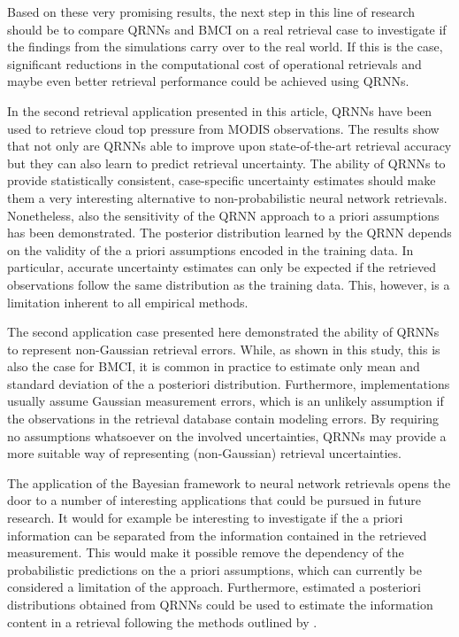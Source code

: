 \documentclass[journal abbreviation, manuscript]{copernicus}
\begin{document}
Based on these very promising results, the next step in this line of research
should be to compare QRNNs and BMCI on a real retrieval case to investigate if
the findings from the simulations carry over to the real world. If this is the
case, significant reductions in the computational cost of operational retrievals
and maybe even better retrieval performance could be achieved using QRNNs.

In the second retrieval application presented in this article, QRNNs have been
used to retrieve cloud top pressure from MODIS observations. The results show
that not only are QRNNs able to improve upon state-of-the-art retrieval accuracy
but they can also learn to predict retrieval uncertainty. The ability of QRNNs
to provide statistically consistent, case-specific uncertainty estimates should
make them a very interesting alternative to non-probabilistic neural network
retrievals. Nonetheless, also the sensitivity of the QRNN approach to a priori
assumptions has been demonstrated. The posterior distribution learned by the
QRNN depends on the validity of the a priori assumptions encoded in the training
data. In particular, accurate uncertainty estimates can only be expected if the
retrieved observations follow the same distribution as the training data. This,
however, is a limitation inherent to all empirical methods.

The second application case presented here demonstrated the ability of QRNNs to represent
non-Gaussian retrieval errors. While, as shown in this study, this is also the case
for BMCI, it is common in practice to estimate only mean and standard
deviation of the a posteriori distribution. Furthermore, implementations usually
assume Gaussian measurement errors, which is an unlikely assumption if the
observations in the retrieval database contain modeling errors. By requiring no
assumptions whatsoever on the involved uncertainties, QRNNs may provide a more
suitable way of representing (non-Gaussian) retrieval uncertainties.

The application of the Bayesian framework to neural network retrievals opens the
door to a number of interesting applications that could be pursued in future
research. It would for example be interesting to investigate if the a priori
information can be separated from the information contained in the retrieved
measurement. This would make it possible remove the dependency of the
probabilistic predictions on the a priori assumptions, which can currently be
considered a limitation of the approach. Furthermore, estimated a posteriori
distributions obtained from QRNNs could be used to estimate the information
content in a retrieval following the methods outlined by \citet{rodgers}.
\end{document}
